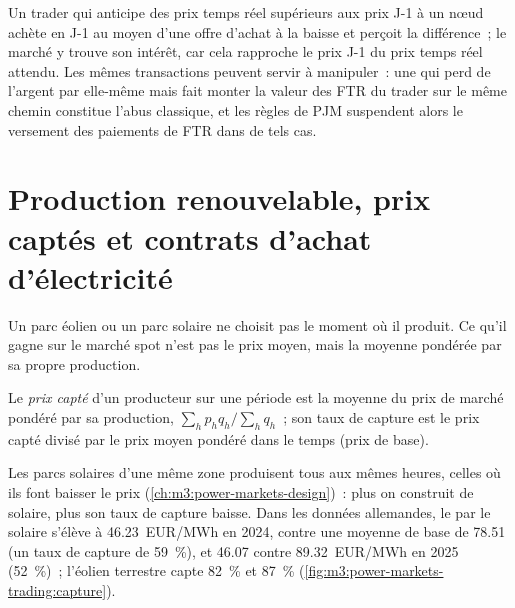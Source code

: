 Un trader qui anticipe des prix temps réel supérieurs aux prix J-1 à un nœud achète en J-1 au moyen
d'une offre d'achat à la baisse et perçoit la différence~; le marché y trouve son intérêt, car cela rapproche le
prix J-1 du prix temps réel attendu. Les mêmes transactions peuvent servir à manipuler~: une
 qui perd de l'argent par elle-même mais fait monter la valeur des FTR du trader sur le même chemin
constitue l'abus classique, et les règles de PJM suspendent alors le versement des paiements de FTR dans de tels cas.

\section{Production renouvelable, prix captés et contrats d'achat d'électricité}

Un parc éolien ou un parc solaire ne choisit pas le moment où il produit. Ce qu'il gagne sur le marché spot
n'est pas le prix moyen, mais la moyenne pondérée par sa propre production.

\begin{definition}\label{def:m3:power-markets-trading:capture}
Le \emph{prix capté} d'un producteur sur une période est la moyenne
du prix de marché pondéré par sa production, $\sum_h p_h q_h / \sum_h q_h$~; son taux de capture est
le prix capté divisé par le prix moyen pondéré dans le temps (prix de base).
\end{definition}

Les parcs solaires d'une même zone produisent tous aux mêmes heures, celles où ils font
baisser le prix (\cref{ch:m3:power-markets-design})~: plus on construit de solaire, plus son taux de capture
baisse. Dans les données allemandes, le  par le solaire s'élève à \qty{46.23}{EUR/MWh} en 2024, contre une
moyenne de base de \qty{78.51}{} (un taux de capture de 59~\%), et \qty{46.07}{} contre
\qty{89.32}{EUR/MWh} en 2025 (52~\%)~; l'éolien terrestre capte 82~\% et 87~\%
(\cref{fig:m3:power-markets-trading:capture}).

